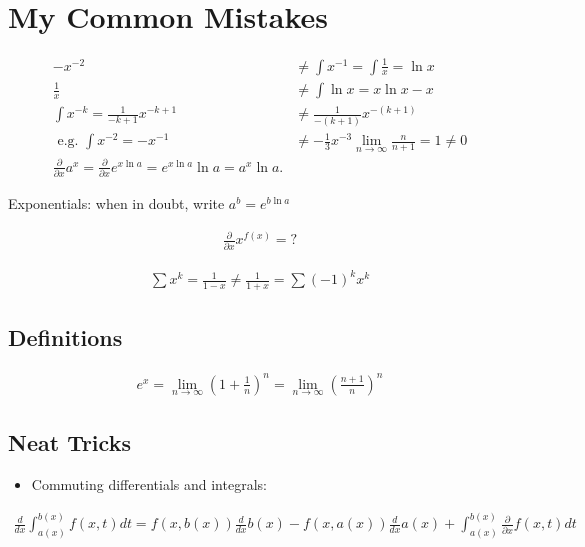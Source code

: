\hypertarget{my-common-mistakes}{%
\section{My Common Mistakes}\label{my-common-mistakes}}

\begin{align*}
-x^{-2} &\neq \int x^{-1} = \int \frac{1}{x} = \ln x \\ 
\frac{1}{x} &\neq \int \ln x = x\ln x - x \\
\int x^{-k} = \frac{1}{-k+1}x^{-k+1} &\neq \frac{1}{-(k+1)}x^{-(k+1)} \\
\text{ e.g. } \int x^{-2} = -x^{-1} &\neq -\frac{1}{3}x^{-3}
\lim_{n\to\infty} \frac{n}{n+1} = 1 \neq 0\\
\frac{\partial}{\partial x}a^x = \frac{\partial}{\partial x}e^{x\ln a} = e^{x\ln a} \ln a = a^x \ln a.
\end{align*}

Exponentials: when in doubt, write \(a^b = e^{b\ln a}\)

\begin{align*}
\frac{\partial}{\partial x} x^{f(x)} = ?
\end{align*}

\begin{align*}
\sum x^k = \frac{1}{1-x} \neq \frac{1}{1+x} = \sum (-1)^k x^k
\end{align*}

\hypertarget{definitions-3}{%
\subsection{Definitions}\label{definitions-3}}

\begin{align*}
e^x = \lim_{n \to \infty} \left(1 + \frac{1}{n}\right)^n = \lim_{n \to \infty} \left( \frac{n+1}{n} \right)^n
\end{align*}

\hypertarget{neat-tricks}{%
\subsection{Neat Tricks}\label{neat-tricks}}

\begin{itemize}
\tightlist
\item
  Commuting differentials and integrals:
\end{itemize}

\begin{align*}
\frac{d}{dx} \int_{a(x)}^{b(x)} f(x,t) dt = f(x, b(x))\frac{d}{dx}b(x) - f(x, a(x))\frac{d}{dx}a(x) + \int_{a(x)}^{b(x)} \frac{\partial}{\partial x} f(x, t) dt
\end{align*}

